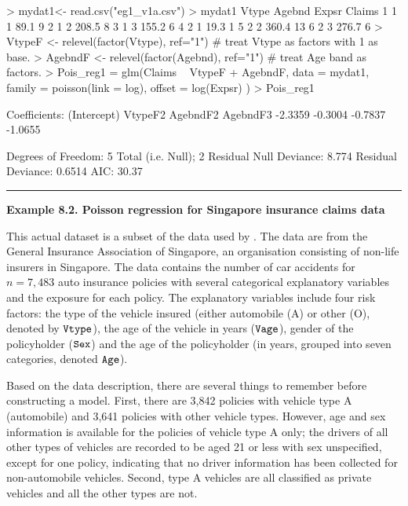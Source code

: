 \documentclass[]{book}
\newenvironment{Shaded}{\begin{snugshade}}{\end{snugshade}}
\newcommand{\NormalTok}[1]{#1}
\theoremstyle{definition}
\theoremstyle{definition}
\theoremstyle{definition}
\theoremstyle{remark}
\begin{document}
\hypertarget{toggleCodeRiskClass.1}{}
\begin{Shaded}
\begin{Highlighting}[]
\NormalTok{> mydat1<- read.csv("eg1_v1a.csv")}
\NormalTok{> mydat1}
\NormalTok{  Vtype Agebnd Expsr Claims}
\NormalTok{1     1      1  89.1      9}
\NormalTok{2     1      2 208.5      8}
\NormalTok{3     1      3 155.2      6}
\NormalTok{4     2      1  19.3      1}
\NormalTok{5     2      2 360.4     13}
\NormalTok{6     2      3 276.7      6}
\NormalTok{> VtypeF <- relevel(factor(Vtype), ref="1") # treat Vtype as factors with 1 as base.}
\NormalTok{> AgebndF <- relevel(factor(Agebnd), ref="1") # treat Age band as factors.}
\NormalTok{> Pois_reg1 = glm(Claims ~ VtypeF + AgebndF,}
\NormalTok{                    data = mydat1, family = poisson(link = log), offset = log(Expsr) )}
\NormalTok{> Pois_reg1}

\NormalTok{Coefficients:}
\NormalTok{(Intercept)      VtypeF2     AgebndF2     AgebndF3  }
\NormalTok{    -2.3359      -0.3004      -0.7837      -1.0655  }

\NormalTok{Degrees of Freedom: 5 Total (i.e. Null);  2 Residual}
\NormalTok{Null Deviance:      8.774 }
\NormalTok{Residual Deviance: 0.6514   AIC: 30.37}
\end{Highlighting}
\end{Shaded}

\begin{center}\rule{0.5\linewidth}{\linethickness}\end{center}

\textbf{Example 8.2. Poisson regression for Singapore insurance claims
data}

This actual dataset is a subset of the data used by
\citep{frees2008hierarchical}. The data are from the General Insurance
Association of Singapore, an organisation consisting of non-life
insurers in Singapore. The data contains the number of car accidents for
\(n=7,483\) auto insurance policies with several categorical explanatory
variables and the exposure for each policy. The explanatory variables
include four risk factors: the type of the vehicle insured (either
automobile (A) or other (O), denoted by \(\tt{Vtype}\)), the age of the
vehicle in years (\(\tt{Vage}\)), gender of the policyholder
(\(\tt{Sex}\)) and the age of the policyholder (in years, grouped into
seven categories, denoted \(\tt{Age}\)).

Based on the data description, there are several things to remember
before constructing a model. First, there are 3,842 policies with
vehicle type A (automobile) and 3,641 policies with other vehicle types.
However, age and sex information is available for the policies of
vehicle type A only; the drivers of all other types of vehicles are
recorded to be aged 21 or less with sex unspecified, except for one
policy, indicating that no driver information has been collected for
non-automobile vehicles. Second, type A vehicles are all classified as
private vehicles and all the other types are not.
\end{document}

